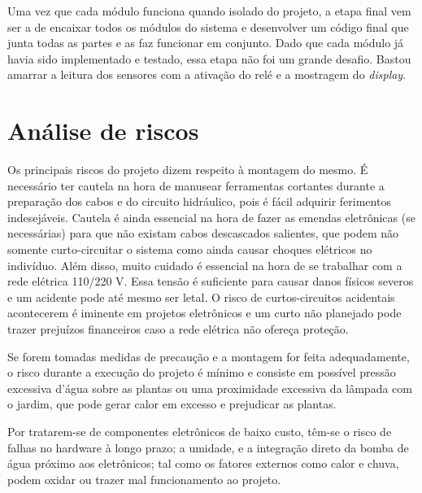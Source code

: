 \documentclass[a4paper,12pt]{article}
\begin{document}
    Uma vez que cada módulo funciona quando isolado do projeto, a etapa final vem ser a de encaixar todos os módulos do sistema e desenvolver um código final que junta todas as partes e as faz funcionar em conjunto. Dado que cada módulo já havia sido implementado e testado, essa etapa não foi um grande desafio. Bastou amarrar a leitura dos sensores com a ativação do relé e a mostragem do \textit{display}.


\newpage
\section{Análise de riscos}
Os principais riscos do projeto dizem respeito à montagem do mesmo. É necessário ter cautela na hora de manusear ferramentas cortantes durante a preparação dos cabos e do circuito hidráulico, pois é fácil adquirir ferimentos indesejáveis. Cautela é ainda essencial na hora de fazer as emendas eletrônicas (se necessárias) para que não existam cabos descascados salientes, que podem não somente curto-circuitar o sistema como ainda causar choques elétricos no indivíduo. Além disso, muito cuidado é essencial na hora de se trabalhar com a rede elétrica 110/220 V. Essa tensão é suficiente para causar danos físicos severos e um acidente pode até mesmo ser letal. \cite{halliday2008eletro} O risco de curtos-circuitos acidentais acontecerem é iminente em projetos eletrônicos e um curto não planejado pode trazer prejuízos financeiros caso a rede elétrica não ofereça proteção.

    Se forem tomadas medidas de precaução e a montagem for feita adequadamente, o risco durante a execução do projeto é mínimo e consiste em possível pressão excessiva d’água sobre as plantas ou uma proximidade excessiva da lâmpada com o jardim, que pode gerar calor em excesso e prejudicar as plantas.

    Por tratarem-se de componentes eletrônicos de baixo custo, têm-se o risco de falhas no hardware à longo prazo; a umidade, e a integração direto da bomba de água próximo aos eletrônicos; tal como os fatores externos como calor e chuva, podem oxidar ou trazer mal funcionamento ao projeto.


\newpage
\end{document}
